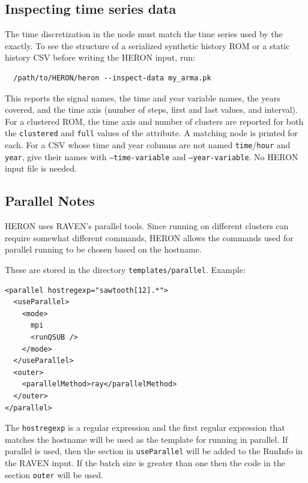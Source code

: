 \subsection{Inspecting time series data}
The time discretization in the  node must match the time series used by the
 exactly. To see the structure of a serialized synthetic history ROM or a
static history CSV before writing the HERON input, run:
\begin{lstlisting}
  /path/to/HERON/heron --inspect-data my_arma.pk
\end{lstlisting}
This reports the signal names, the time and year variable names, the years covered, and the time
axis (number of steps, first and last values, and interval). For a clustered ROM, the time axis
and number of clusters are reported for both the \texttt{clustered} and \texttt{full} values of the
  attribute. A matching  node is
printed for each. For a CSV whose time and year columns are not named \texttt{time}/\texttt{hour} and
\texttt{year}, give their names with \texttt{--time-variable} and \texttt{--year-variable}. No HERON
input file is needed.

\subsection{Parallel Notes}

HERON uses RAVEN's parallel tools. Since running on different clusters
can require somewhat different commands, HERON allows the commands
used for parallel running to be chosen based on the hostname.

These are stored in the directory \texttt{templates/parallel}. Example:

\begin{lstlisting}[style=XML]
<parallel hostregexp="sawtooth[12].*">
  <useParallel>
    <mode>
      mpi
      <runQSUB />
    </mode>
  </useParallel>
  <outer>
    <parallelMethod>ray</parallelMethod>
  </outer>
</parallel>
\end{lstlisting}

The \texttt{hostregexp} is a regular expression and the first regular
expression that matches the hostname will be used as the template for
running in parallel.  If parallel is used, then the section in
\texttt{useParallel} will be added to the RunInfo in the RAVEN
input. If the batch size is greater than one then the code in the
section \texttt{outer} will be used.

